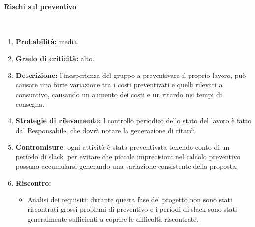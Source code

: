\paragraph{Rischi sul preventivo}\mbox{}\\
\begin{enumerate}
	\item \textbf{Probabilità:} media.
	\item \textbf{Grado di criticità:} alto.
	\item \textbf{Descrizione:} l’inesperienza del gruppo a preventivare il proprio lavoro, può causare una forte variazione tra i costi preventivati e quelli rilevati a consuntivo, causando un aumento dei costi e un ritardo nei tempi di consegna.
	\item \textbf{Strategie di rilevamento:} l controllo periodico dello stato del lavoro è fatto dal Responsabile, che dovrà notare la generazione di ritardi.
	\item \textbf{Contromisure:} ogni attività è stata preventivata tenendo conto di un periodo di slack, per evitare che piccole imprecisioni nel calcolo preventivo possano accumularsi generando una variazione consistente della proposta;
	\item \textbf{Riscontro:}
	\begin{itemize}
	\item Analisi dei requisiti: durante questa fase del progetto non sono stati riscontrati grossi problemi di preventivo e i periodi di slack sono stati generalmente sufficienti a coprire le difficoltà riscontrate.
	\end{itemize}
\end{enumerate}